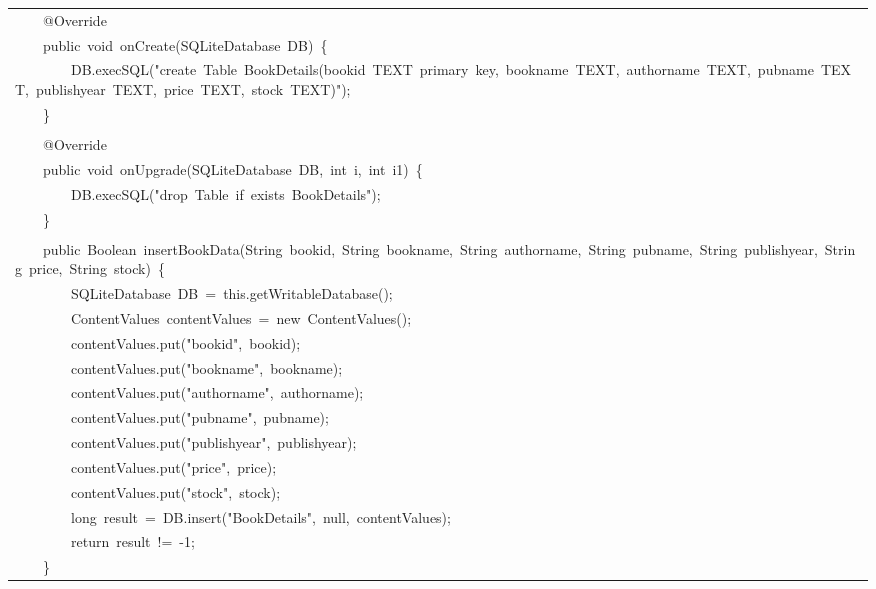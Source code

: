 \documentclass[a4paper,12pt]{article}
\begin{document}
\begin{longtable}{|p{}|}
{\ttfamily\small \ \ \ \ @Override} \\
{\ttfamily\small \ \ \ \ public\ void\ onCreate(SQLiteDatabase\ DB)\ \{} \\
{\ttfamily\small \ \ \ \ \ \ \ \ DB.execSQL("create\ Table\ BookDetails(bookid\ TEXT\ primary\ key,\ bookname\ TEXT,\ authorname\ TEXT,\ pubname\ TEXT,\ publishyear\ TEXT,\ price\ TEXT,\ stock\ TEXT)");} \\
{\ttfamily\small \ \ \ \ \}} \\
\strut \\
{\ttfamily\small \ \ \ \ @Override} \\
{\ttfamily\small \ \ \ \ public\ void\ onUpgrade(SQLiteDatabase\ DB,\ int\ i,\ int\ i1)\ \{} \\
{\ttfamily\small \ \ \ \ \ \ \ \ DB.execSQL("drop\ Table\ if\ exists\ BookDetails");} \\
{\ttfamily\small \ \ \ \ \}} \\
\strut \\
{\ttfamily\small \ \ \ \ public\ Boolean\ insertBookData(String\ bookid,\ String\ bookname,\ String\ authorname,\ String\ pubname,\ String\ publishyear,\ String\ price,\ String\ stock)\ \{} \\
{\ttfamily\small \ \ \ \ \ \ \ \ SQLiteDatabase\ DB\ =\ this.getWritableDatabase();} \\
{\ttfamily\small \ \ \ \ \ \ \ \ ContentValues\ contentValues\ =\ new\ ContentValues();} \\
{\ttfamily\small \ \ \ \ \ \ \ \ contentValues.put("bookid",\ bookid);} \\
{\ttfamily\small \ \ \ \ \ \ \ \ contentValues.put("bookname",\ bookname);} \\
{\ttfamily\small \ \ \ \ \ \ \ \ contentValues.put("authorname",\ authorname);} \\
{\ttfamily\small \ \ \ \ \ \ \ \ contentValues.put("pubname",\ pubname);} \\
{\ttfamily\small \ \ \ \ \ \ \ \ contentValues.put("publishyear",\ publishyear);} \\
{\ttfamily\small \ \ \ \ \ \ \ \ contentValues.put("price",\ price);} \\
{\ttfamily\small \ \ \ \ \ \ \ \ contentValues.put("stock",\ stock);} \\
{\ttfamily\small \ \ \ \ \ \ \ \ long\ result\ =\ DB.insert("BookDetails",\ null,\ contentValues);} \\
{\ttfamily\small \ \ \ \ \ \ \ \ return\ result\ !=\ -1;} \\
{\ttfamily\small \ \ \ \ \}} \\

\end{longtable}
\end{document}
